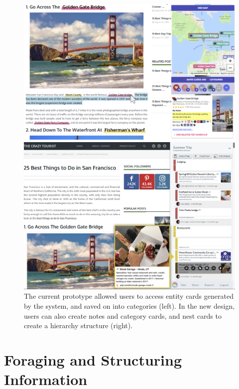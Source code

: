 \begin{figure}
\centering
\begin{minipage}{.49\textwidth}
  \centering
  \includegraphics[width=\textwidth]{Chapters/Fusion/main.png}
\end{minipage}%
\begin{minipage}{.49\textwidth}
  \centering
  \includegraphics[width=\textwidth]{images/fuse.png}
\end{minipage}
\caption{The current prototype allowed users to access entity cards generated by the system, and saved on into categories (left). In the new design, users can also create notes and category cards, and nest cards to create a hierarchy structure (right).}
\label{fig:test2}
\end{figure}


\section{Foraging and Structuring Information}%

